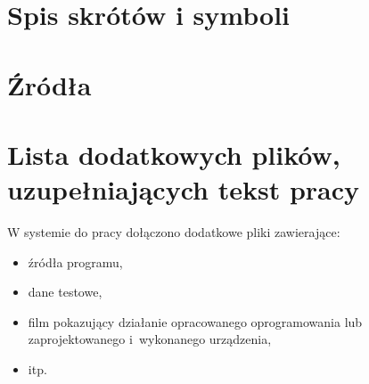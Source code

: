 \documentclass[a4paper,twoside,12pt]{book}
\begin{document}
\begin{appendices}

\chapter{Spis skrótów i symboli}



\chapter{Źródła}






\chapter{Lista dodatkowych plików, uzupełniających tekst pracy} 


W systemie do pracy dołączono dodatkowe pliki zawierające:
\begin{itemize}
\item źródła programu,
\item dane testowe,
\item film pokazujący działanie opracowanego oprogramowania lub zaprojektowanego i~wykonanego urządzenia,
\item itp.
\end{itemize}


\listoffigures
{}
\listoftables
{}

\end{appendices}
\end{document}
